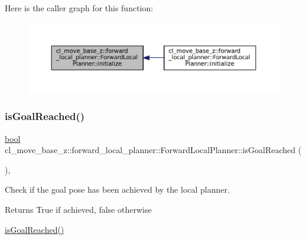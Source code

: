 Here is the caller graph for this function\+:
\nopagebreak
\begin{figure}[H]
\begin{center}
\leavevmode
\includegraphics[width=350pt]{classcl__move__base__z_1_1forward__local__planner_1_1ForwardLocalPlanner_ab455a974d5dcffda7e9772023840c7e6_icgraph}
\end{center}
\end{figure}
\mbox{\label{classcl__move__base__z_1_1forward__local__planner_1_1ForwardLocalPlanner_aafab1572c86c2e9d0b003e36fe9bfb88}} 
\subsubsection{\texorpdfstring{is\+Goal\+Reached()}{isGoalReached()}}
{\footnotesize\ttfamily \hyperlink{classbool}{bool} cl\+\_\+move\+\_\+base\+\_\+z\+::forward\+\_\+local\+\_\+planner\+::\+Forward\+Local\+Planner\+::is\+Goal\+Reached (\begin{DoxyParamCaption}{ }\end{DoxyParamCaption})\hspace{0.3cm}{\ttfamily [override]}, {\ttfamily [virtual]}}



Check if the goal pose has been achieved by the local planner. 

\begin{DoxyReturn}{Returns}
True if achieved, false otherwise
\end{DoxyReturn}
\hyperlink{classcl__move__base__z_1_1forward__local__planner_1_1ForwardLocalPlanner_aafab1572c86c2e9d0b003e36fe9bfb88}{is\+Goal\+Reached()} 

